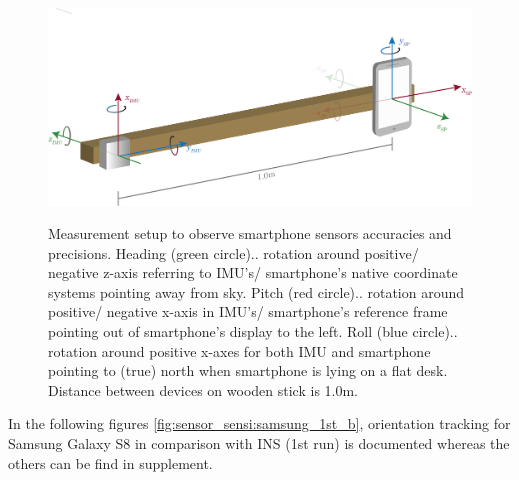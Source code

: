\documentclass[review]{elsarticle}
\begin{document}
\begin{figure}[htbp!]
\begin{center}
	\centering
	\includegraphics[keepaspectratio, width=1\columnwidth]{graphics/sensor_construction}
	\label{fig:technology:sensor:construction}
	\caption{Measurement setup to observe smartphone sensors accuracies and precisions. Heading (green circle).. rotation around positive/ negative z-axis referring to \gls{IMU}'s/ smartphone's native coordinate systems pointing away from sky. Pitch (red circle).. rotation around positive/ negative x-axis in \gls{IMU}'s/ smartphone's reference frame pointing out of smartphone's display to the left. Roll (blue circle).. rotation around positive x-axes for both \gls{IMU} and smartphone pointing to (true) north when smartphone is lying on a flat desk. Distance between devices on wooden stick is 1.0m.}
\end{center}
\end{figure}

In the following figures \ref{fig:sensor_sensi:samsung_1st_b}, orientation tracking for Samsung Galaxy S8 in comparison with \gls{INS} (1st run) is documented whereas the others can be find in supplement. 
\end{document}
